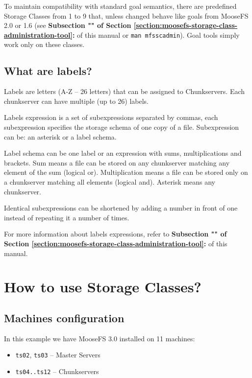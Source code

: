 \documentclass[a4paper,11pt,english]{report}
\def\code#1{\texttt{#1}}
\begin{document}
			 To maintain compatibility with standard goal semantics, there are predefined Storage Classes from 1 to 9 that, unless changed behave like goals from MooseFS 2.0 or 1.6 (see \textbf{Subsection "" of Section \ref{section:moosefs-storage-class-administration-tool}: } of this manual or \code{man mfsscadmin}). Goal tools simply work only on these classes.	
			
			\subsection{What are labels?}
			Labels are letters (A-Z -- 26 letters) that can be assigned to Chunkservers. Each chunkserver can have multiple (up to 26) labels.
			
			Labels expression is a set of subexpressions separated by commas, each subexpression specifies the storage schema of one copy of a file. Subexpression can be: an asterisk or a label schema.
			
			Label schema can be one label or an expression with sums, multiplications and brackets. Sum means a file can be stored on any chunkserver matching any element of the sum (logical or). Multiplication means a file can be stored only on a chunkserver matching all elements (logical and).  Asterisk means any chunkserver.
			
			Identical subexpressions can be shortened by adding a number in front of one instead of repeating it a number of times.
			
			For more information about labels expressions, refer to \textbf{Subsection "" of Section \ref{section:moosefs-storage-class-administration-tool}: } of this manual.
	
	
			
		\section{How to use Storage Classes?}
			\subsection{Machines configuration}
			In this example we have MooseFS 3.0 installed on 11 machines:
			\begin{itemize}
				\item \code{ts02}, \code{ts03} -- Master Servers
				\item \code{ts04..ts12} -- Chunkservers
			\end{itemize}
			\bigskip
			
\end{document}
